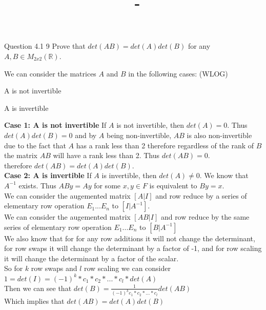 \documentclass[answers,12pt,addpoints]{exam}
\author{\name}
\title{\course \ - \assignment}
\begin{document}
\maketitle


\newpage
\begin{questions}
    \item Question 4.1 9
    Prove that $det(AB) = det(A)det(B)$ for any $A,B \in M_{2x2}(\mathbb{R})$.
    \begin{solution}
        We can consider the matrices $A$ and $B$ in the following cases: (WLOG)
        \begin{parts}
            \item A is not invertible
            \item A is invertible
        \end{parts}
        \textbf{Case 1: A is not invertible}
        If $A$ is not invertible, then $det(A) = 0$. Thus $det(A)det(B) = 0$ and by $A$ being non-invertible, $AB$ is also non-invertible due to the fact that $A$ has a rank less than 2 therefore regardless of the rank of $B$ the matrix $AB$ will have a rank less than 2. Thus $det(AB) = 0$.\\
        therefore $det(AB) = det(A)det(B)$.\\
        \textbf{Case 2: A is invertible}
        If $A$ is invertible, then $det(A) \neq 0$. We know that $A^{-1}$ exists. Thus $ABy =Ay$ for some $x,y \in F$ is equivalent to $By = x$. \\
        We can consider the augemented matrix $[A|I]$ and row reduce by a series of elementary row operation $E_1 ... E_n$ to $[I|A^{-1}]$.  \\
        We can consider the augemented matrix $[AB|I]$ and row reduce by the same series of elementary row operation $E_1 ... E_n$ to $[B|A^{-1}]$\\
        We also know that for for any row additions it will not change the determinant, for row swaps it will change the determinant by a factor of -1, and for row scaling it will change the determinant by a factor of the scalar.\\
        So for $k$ row swaps and $l$ row scaling we can consider 
        $ 1 = det(I) = (-1)^k * c_1 * c_2 * ... * c_l * det(A)$\\  
        Then we can see that $det(B) = \frac{1}{(-1)^k c_1 * c_2 * ... * c_l} det(AB) $\\
        Which implies that $det(AB) = det(A)det(B)$


\end{solution}
\end{questions}
\end{document}
